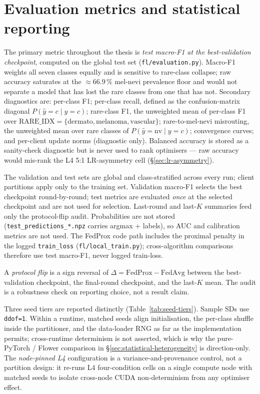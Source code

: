 \documentclass[11pt,a4paper]{report}
\begin{document}
\section{Evaluation metrics and statistical reporting}
\label{sec:method-metrics}

The primary metric throughout the thesis is \emph{test macro-F1 at the
best-validation checkpoint}, computed on the global test set
(\texttt{fl/evaluation.py}). Macro-F1 weights all seven classes equally
and is sensitive to rare-class collapse; raw accuracy saturates at the
$\approx 66.9\,\%$ mel-nevi prevalence floor and would not separate a
model that has lost the rare classes from one that has not. Secondary
diagnostics are: per-class F1; per-class recall, defined as the
confusion-matrix diagonal $P(\hat{y} = c \mid y = c)$;
rare-class F1, the unweighted mean of per-class F1 over $\mathrm{RARE\_IDX}
= \{\text{dermato}, \text{melanoma}, \text{vascular}\}$;
rare-to-mel-nevi misrouting, the unweighted mean over rare classes of
$P(\hat{y} = \text{nv} \mid y = c)$; convergence curves; and per-client
update norms (diagnostic only). Balanced accuracy is stored as a
sanity-check diagnostic but is never used to rank optimisers --- raw
accuracy would mis-rank the L4 5{:}1 LR-asymmetry cell
(§\ref{sec:lr-asymmetry}).

The validation and test sets are global and class-stratified across
every run; client partitions apply only to the training set. Validation
macro-F1 selects the best checkpoint round-by-round; test metrics are
evaluated \emph{once} at the selected checkpoint and are not used for
selection. Last-round and last-$K$ summaries feed only the
protocol-flip audit. Probabilities are not stored
(\texttt{test\_predictions\_*.npz} carries argmax + labels), so AUC and
calibration metrics are not used. The FedProx code path includes the
proximal penalty in the logged \texttt{train\_loss}
(\texttt{fl/local\_train.py}); cross-algorithm comparisons therefore
use test macro-F1, never logged train-loss.

A \emph{protocol flip} is a sign reversal of $\Delta = \mathrm{FedProx}
- \mathrm{FedAvg}$ between the best-validation checkpoint, the
final-round checkpoint, and the last-$K$ mean. The audit is a
robustness check on reporting choice, not a result claim.

Three seed tiers are reported distinctly (Table~\ref{tab:seed-tiers}).
Sample SDs use \texttt{ddof=1}. Within a runtime, matched seeds align
initialisation, the per-class shuffle inside the partitioner, and the
data-loader RNG as far as the implementation permits; cross-runtime
determinism is not asserted, which is why the pure-PyTorch / Flower
comparison in §\ref{sec:statistical-heterogeneity} is direction-only.
The \emph{node-pinned L4} configuration is a variance-and-provenance
control, not a partition design: it re-runs L4 four-condition cells on
a single compute node with matched seeds to isolate cross-node CUDA
non-determinism from any optimiser effect.
\end{document}
